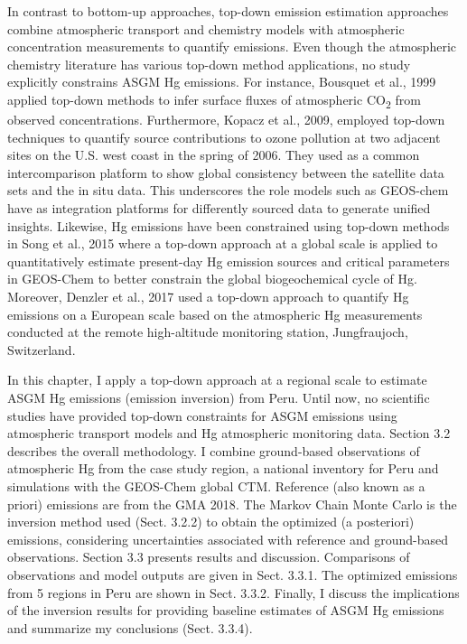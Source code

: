 \begin{flushleft}
In contrast to bottom-up approaches, top-down emission estimation approaches combine atmospheric transport and chemistry models with atmospheric concentration measurements to quantify emissions. Even though the atmospheric chemistry literature has various top-down method applications, no study explicitly constrains ASGM Hg emissions. For instance, Bousquet et al., 1999 applied top-down methods to infer surface fluxes of atmospheric CO\textsubscript{2} from observed concentrations\cite{bousquet_inverse_1999}. Furthermore, Kopacz et al., 2009, employed top-down techniques to quantify source contributions to ozone pollution at two adjacent sites on the U.S. west coast in the spring of 2006\cite{kopacz_global_2010}. They used  \gc as a common intercomparison platform to show global consistency between the satellite data sets and the in situ data. This underscores the role models such as GEOS-chem have as integration platforms for differently sourced data to generate unified insights. Likewise, Hg emissions have been constrained using top-down methods in Song et al., 2015 where a top-down approach at a global scale is applied to quantitatively estimate present-day Hg emission sources and critical parameters in GEOS-Chem to better constrain the global biogeochemical cycle of Hg\cite{song_top-down_2015}. Moreover, Denzler et al., 2017 used a top-down approach to quantify Hg emissions on a European scale based on the atmospheric Hg measurements conducted at the remote high-altitude monitoring station, Jungfraujoch, Switzerland\cite{denzler_inversion_2017}. 
\end{flushleft}
\begin{flushleft}
In this chapter, I apply a top-down approach at a regional scale to estimate ASGM Hg emissions (emission inversion) from Peru. Until now, no scientific studies have provided top-down constraints for ASGM emissions using atmospheric transport models and Hg atmospheric monitoring data. Section 3.2 describes the overall methodology. I combine ground-based observations of atmospheric Hg from the case study region\cite{koenig_seasonal_2021}, a national inventory for Peru\cite{artisanal_gold_council_reporte_2017} and simulations with the GEOS-Chem global CTM. Reference (also known as a priori) emissions are from the GMA 2018\cite{steenhuisen_development_2019,united_nations_environment_programme_technical_2019}. The Markov Chain Monte Carlo is the inversion method used (Sect. 3.2.2) to obtain the optimized (a posteriori) emissions, considering uncertainties associated with reference and ground-based observations. Section 3.3 presents results and discussion. Comparisons of observations and model outputs are given in Sect. 3.3.1. The optimized emissions from 5 regions in Peru are shown in Sect. 3.3.2. Finally, I discuss the implications of the inversion results for providing baseline estimates of ASGM Hg emissions  and summarize my conclusions (Sect. 3.3.4).

\end{flushleft}
\newpage
